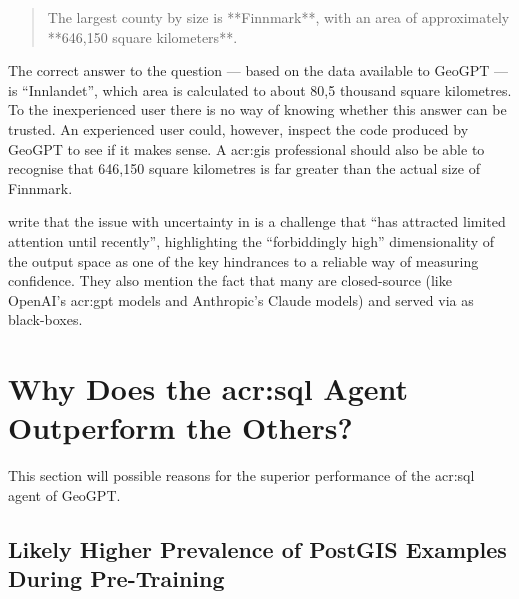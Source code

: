 \begin{quote}
    The largest county by size is **Finnmark**, with an area of approximately **646,150 square kilometers**.
\end{quote}

The correct answer to the question --- based on the data available to GeoGPT --- is \enquote{Innlandet}, which area is calculated to about 80,5 thousand square kilometres. To the inexperienced user there is no way of knowing whether this answer can be trusted. An experienced user could, however, inspect the code produced by GeoGPT to see if it makes sense. A \acrshort{acr:gis} professional should also be able to recognise that 646,150 square kilometres is far greater than the actual size of Finnmark.

\citep[1-2]{linGeneratingConfidenceUncertainty2023} write that the issue with uncertainty in  is a challenge that \enquote{has attracted limited attention until recently}, highlighting the \enquote{forbiddingly high} dimensionality of the output space as one of the key hindrances to a reliable way of measuring confidence. They also mention the fact that many  are closed-source (like OpenAI's \acrshort{acr:gpt} models and Anthropic's Claude models) and served via  as black-boxes.


\section[Why Does the SQL Agent Outperform the Others?]{Why Does the \acrshort{acr:sql} Agent Outperform the Others?}
\label{sec:why-sql-better}

This section will possible reasons for the superior performance of the \acrshort{acr:sql} agent of GeoGPT.

\subsection{Likely Higher Prevalence of PostGIS Examples During Pre-Training}

